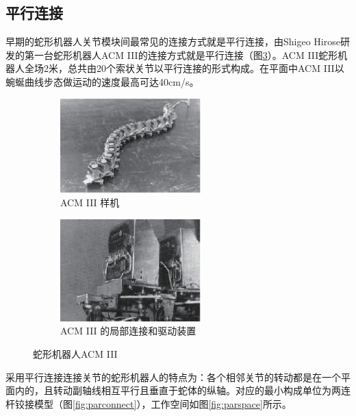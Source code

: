 \subsection{平行连接}
早期的蛇形机器人关节模块间最常见的连接方式就是平行连接，由Shigeo Hirose研发的第一台蛇形机器人ACM III的连接方式就是平行连接\cite{Endo1999Study}（图\ref{fig:ACM}）。ACM III蛇形机器人全场2米，总共由20个索状关节以平行连接的形式构成。在平面中ACM III以蜿蜒曲线步态做运动的速度最高可达40cm/s。
\begin{figure}[h!] %
	\begin{subfigure}{0.5\textwidth}
		\centering
		\includegraphics[width=0.6\textwidth,height=0.15\textheight]{figure/chap03/ACMIII.eps}
		\caption{ACM III 样机}
		\label{fig:ACMIII}
	\end{subfigure}
	\begin{subfigure}{0.5\textwidth}
		\centering
		\includegraphics[width=0.6\textwidth,height=0.15\textheight]{figure/chap03/ACMs.eps}
		\caption{ACM III 的局部连接和驱动装置}
		\label{fig:ACMS}
	\end{subfigure}
	\caption{蛇形机器人ACM III}
	\label{fig:ACM}
\end{figure}
采用平行连接连接关节的蛇形机器人的特点为：各个相邻关节的转动都是在一个平面内的，且转动副轴线相互平行且垂直于蛇体的纵轴。对应的最小构成单位为两连杆铰接模型（图\ref{fig:parconnect}），工作空间如图\ref{fig:parspace}所示。
